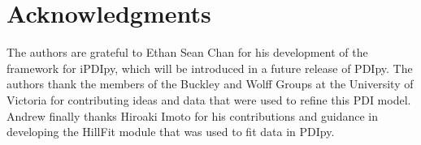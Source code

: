\section{Acknowledgments}
The authors are grateful to Ethan Sean Chan for his development of the framework for iPDIpy, which will be introduced in a future release of PDIpy. The authors thank the members of the Buckley and Wolff Groups at the University of Victoria for contributing ideas and data that were used to refine this PDI model. Andrew finally thanks Hiroaki Imoto for his contributions and guidance in developing the HillFit module that was used to fit data in PDIpy.
